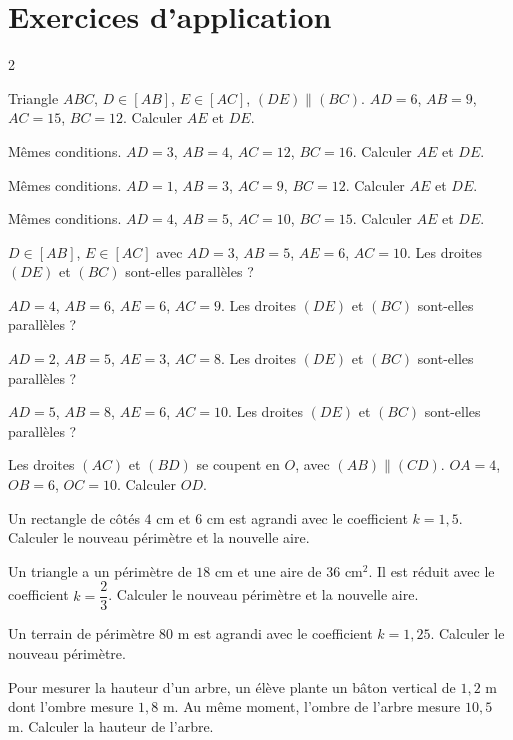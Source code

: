 \section{Exercices d'application}
\begin{multicols}{2}

\exo{} Triangle $ABC$, $D\in[AB]$, $E\in[AC]$, $(DE)\parallel(BC)$. $AD=6$,
$AB=9$, $AC=15$, $BC=12$. Calculer $AE$ et $DE$.

\exo{} Mêmes conditions. $AD=3$, $AB=4$, $AC=12$, $BC=16$. Calculer $AE$ et $DE$.

\exo{} Mêmes conditions. $AD=1$, $AB=3$, $AC=9$, $BC=12$. Calculer $AE$ et $DE$.

\exo{} Mêmes conditions. $AD=4$, $AB=5$, $AC=10$, $BC=15$. Calculer $AE$ et $DE$.

\exo{} $D\in[AB]$, $E\in[AC]$ avec $AD=3$, $AB=5$, $AE=6$, $AC=10$. Les droites
$(DE)$ et $(BC)$ sont-elles parallèles ?

\exo{} $AD=4$, $AB=6$, $AE=6$, $AC=9$. Les droites $(DE)$ et $(BC)$ sont-elles
parallèles ?

\exo{} $AD=2$, $AB=5$, $AE=3$, $AC=8$. Les droites $(DE)$ et $(BC)$ sont-elles
parallèles ?

\exo{} $AD=5$, $AB=8$, $AE=6$, $AC=10$. Les droites $(DE)$ et $(BC)$ sont-elles
parallèles ?

\exo{} Les droites $(AC)$ et $(BD)$ se coupent en $O$, avec $(AB)\parallel(CD)$.
$OA=4$, $OB=6$, $OC=10$. Calculer $OD$.

\exo{} Un rectangle de côtés $4$ cm et $6$ cm est agrandi avec le coefficient
$k=1{,}5$. Calculer le nouveau périmètre et la nouvelle aire.

\exo{} Un triangle a un périmètre de $18$ cm et une aire de $36\text{ cm}^2$. Il
est réduit avec le coefficient $k=\dfrac23$. Calculer le nouveau périmètre et la nouvelle
aire.

\exo{} Un terrain de périmètre $80$ m est agrandi avec le coefficient $k=1{,}25$.
Calculer le nouveau périmètre.

\exo{} Pour mesurer la hauteur d'un arbre, un élève plante un bâton vertical de
$1{,}2$ m dont l'ombre mesure $1{,}8$ m. Au même moment, l'ombre de l'arbre mesure $10{,}5$
m. Calculer la hauteur de l'arbre.


\end{multicols}
